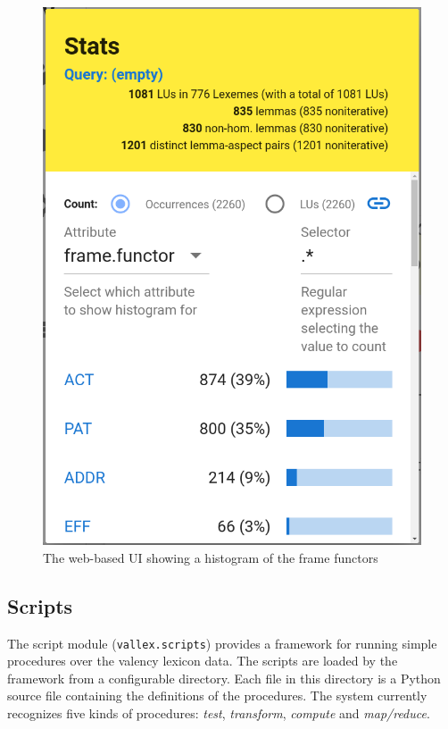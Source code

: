 \documentclass[10pt, a4paper]{article}
\newcommand{\py}[1]{{\tt #1}}
\begin{document}
\begin{figure}
    \includegraphics[width=\hsize]{images/histogram.png}
    \caption{\label{fig:histogram}The web-based UI showing a histogram of the frame functors}
\end{figure}

\subsection{Scripts}
The script module (\py{vallex.scripts}) provides a framework for running simple procedures over the
valency lexicon data. The scripts are loaded by the framework from a configurable directory. Each
file in this directory is a Python source file containing the definitions of the procedures.
The system currently recognizes five kinds of procedures: \emph{test}, \emph{transform}, \emph{compute} and \emph{map/reduce}.
\end{document}
